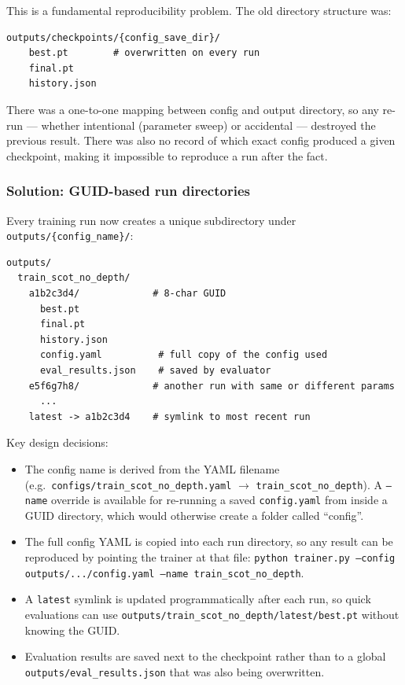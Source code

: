 This is a fundamental reproducibility problem. The old directory structure was:
\begin{verbatim}
outputs/checkpoints/{config_save_dir}/
    best.pt        # overwritten on every run
    final.pt
    history.json
\end{verbatim}

There was a one-to-one mapping between config and output directory, so any re-run --- whether intentional (parameter sweep) or accidental --- destroyed the previous result. There was also no record of which exact config produced a given checkpoint, making it impossible to reproduce a run after the fact.

\subsubsection{Solution: GUID-based run directories}

Every training run now creates a unique subdirectory under \texttt{outputs/\{config\_name\}/}:
\begin{verbatim}
outputs/
  train_scot_no_depth/
    a1b2c3d4/             # 8-char GUID
      best.pt
      final.pt
      history.json
      config.yaml          # full copy of the config used
      eval_results.json    # saved by evaluator
    e5f6g7h8/             # another run with same or different params
      ...
    latest -> a1b2c3d4    # symlink to most recent run
\end{verbatim}

Key design decisions:
\begin{itemize}
    \item The config name is derived from the YAML filename (e.g.\ \texttt{configs/train\_scot\_no\_depth.yaml} $\to$ \texttt{train\_scot\_no\_depth}). A \texttt{--name} override is available for re-running a saved \texttt{config.yaml} from inside a GUID directory, which would otherwise create a folder called ``config''.
    \item The full config YAML is copied into each run directory, so any result can be reproduced by pointing the trainer at that file: \texttt{python trainer.py --config outputs/.../config.yaml --name train\_scot\_no\_depth}.
    \item A \texttt{latest} symlink is updated programmatically after each run, so quick evaluations can use \texttt{outputs/train\_scot\_no\_depth/latest/best.pt} without knowing the GUID.
    \item Evaluation results are saved next to the checkpoint rather than to a global \texttt{outputs/eval\_results.json} that was also being overwritten.
\end{itemize}

